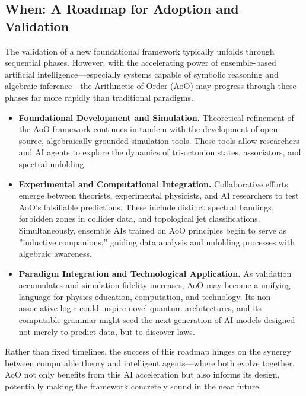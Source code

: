 \documentclass[11pt, a4paper]{article}
\theoremstyle{definition}
\theoremstyle{remark}
\begin{document}
\subsection*{When: A Roadmap for Adoption and Validation}
The validation of a new foundational framework typically unfolds through sequential phases. However, with the accelerating power of ensemble-based artificial intelligence—especially systems capable of symbolic reasoning and algebraic inference—the Arithmetic of Order (AoO) may progress through these phases far more rapidly than traditional paradigms.
\begin{itemize}
    \item \textbf{Foundational Development and Simulation.} Theoretical refinement of the AoO framework continues in tandem with the development of open-source, algebraically grounded simulation tools. These tools allow researchers and AI agents to explore the dynamics of tri-octonion states, associators, and spectral unfolding.
    \item \textbf{Experimental and Computational Integration.} Collaborative efforts emerge between theorists, experimental physicists, and AI researchers to test AoO’s falsifiable predictions. These include distinct spectral bandings, forbidden zones in collider data, and topological jet classifications. Simultaneously, ensemble AIs trained on AoO principles begin to serve as ”inductive companions,” guiding data analysis and unfolding processes with algebraic awareness.
    \item \textbf{Paradigm Integration and Technological Application.} As validation accumulates and simulation fidelity increases, AoO may become a unifying language for physics education, computation, and technology. Its non-associative logic could inspire novel quantum architectures, and its computable grammar might seed the next generation of AI models designed not merely to predict data, but to discover laws.
\end{itemize}
Rather than fixed timelines, the success of this roadmap hinges on the synergy between computable theory and intelligent agents—where both evolve together. AoO not only benefits from this AI acceleration but also informs its design, potentially making the framework concretely sound in the near future.
\end{document}
